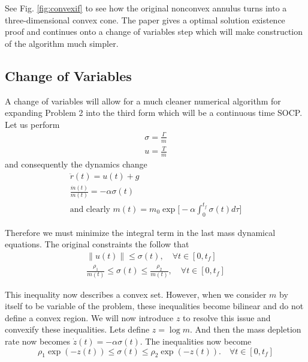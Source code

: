 \documentclass[journal]{new-aiaa}
\begin{document}
\begin{singlespace}
See Fig. \ref{fig:convexif} to see how the original nonconvex annulus turns into a three-dimensional convex cone. The \citep{ploen2007} paper gives a optimal solution existence proof and continues onto a change of variables step which will make construction of the algorithm much simpler.

\subsection{Change of Variables}
A change of variables will allow for a much cleaner numerical algorithm for expanding Problem 2 into the third form which will be a continuous time SOCP. Let us perform
\begin{align}
\sigma = \frac{\Gamma}{m} \\
u = \frac{T}{m}
\end{align}
and consequently the dynamics change
\begin{align}
\ddot{r}(t) = u(t) + g \\
\frac{\dot{m}(t)}{m(t)} = -\alpha\sigma(t) \\
\text{and clearly } m(t)= m_0\exp\big[-\alpha \int^{t_f}_0 \sigma(t)d\tau \big]
\end{align}

Therefore we must minimize the integral term in the last mass dynamical equations. The original constraints the follow that
\begin{align}
\|u(t)\| \leq \sigma(t), \quad \forall t \in [0,t_f] \\
\frac{\rho_1}{m(t)} \leq \sigma(t) \leq \frac{\rho_2}{m(t)}, \quad \forall t \in [0,t_f] 
\end{align}

This inequality now describes a convex set. However, when we consider $m$ by itself to be variable of the problem, these inequalities become bilinear and do not define a convex region. We will now introduce $z$ to resolve this issue and convexify these inequalities. Lets define $z = \log{m}$. And then the mass depletion rate now becomes $\dot{z}(t) = -\alpha\sigma(t)$.
The inequalities now become
\begin{equation} \label{convinq}
\rho_1\exp{(-z(t))} \leq \sigma(t) \leq \rho_2\exp{(-z(t))}. \quad \forall t \in [0, t_f]
\end{equation}


\end{singlespace}
\end{document}
